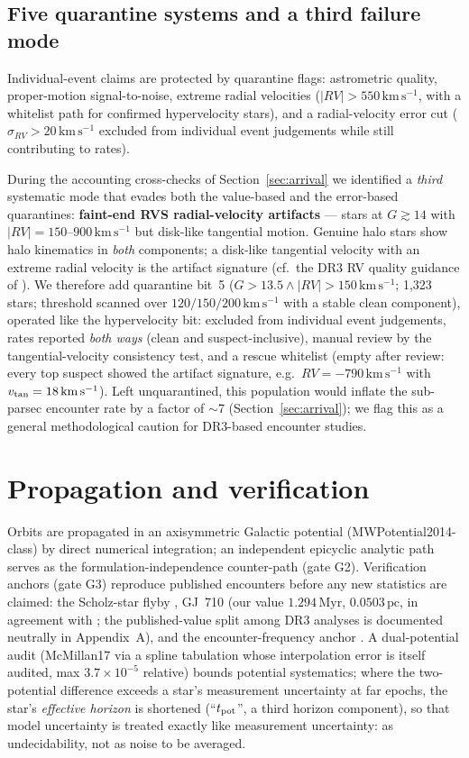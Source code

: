 \documentclass[11pt]{article}
\newcommand{\Myr}{\,\mathrm{Myr}}
\newcommand{\pc}{\,\mathrm{pc}}
\newcommand{\kms}{\,\mathrm{km\,s^{-1}}}
\begin{document}
\subsection{Five quarantine systems and a third failure mode}
\label{sec:bit5}
Individual-event claims are protected by quarantine flags: astrometric
quality, proper-motion signal-to-noise, extreme radial velocities
($|RV|>550\kms$, with a whitelist path for confirmed hypervelocity stars),
and a radial-velocity error cut ($\sigma_{RV}>20\kms$ excluded from
individual event judgements while still contributing to rates).

During the accounting cross-checks of Section~\ref{sec:arrival} we
identified a \emph{third} systematic mode that evades both the value-based
and the error-based quarantines: \textbf{faint-end RVS radial-velocity
artifacts} --- stars at $G\gtrsim14$ with $|RV|=150$--$900\kms$ but
disk-like tangential motion. Genuine halo stars show halo kinematics in
\emph{both} components; a disk-like tangential velocity with an extreme
radial velocity is the artifact signature (cf.\ the DR3 RV quality
guidance of \cite{katz23}). We therefore add quarantine bit~5
($G>13.5\wedge|RV|>150\kms$; 1{,}323 stars; threshold scanned over
$120/150/200\kms$ with a stable clean component), operated like the
hypervelocity bit: excluded from individual event judgements, rates
reported \emph{both ways} (clean and suspect-inclusive), manual review by
the tangential-velocity consistency test, and a rescue whitelist (empty
after review: every top suspect showed the artifact signature, e.g.\
$RV=-790\kms$ with $v_{\rm tan}=18\kms$). Left unquarantined, this
population would inflate the sub-parsec encounter rate by a factor of
$\sim$7 (Section~\ref{sec:arrival}); we flag this as a general
methodological caution for DR3-based encounter studies.

\section{Propagation and verification}\label{sec:prop}

Orbits are propagated in an axisymmetric Galactic potential
(MWPotential2014-class) by direct numerical integration; an independent
epicyclic analytic path serves as the formulation-independence counter-path
(gate G2). Verification anchors (gate G3) reproduce published encounters
before any new statistics are claimed: the Scholz-star flyby
\cite{mamajek15,dupuy19}, GJ~710 (our value $1.294\Myr$, $0.0503\pc$,
in agreement with \cite{dlfm22}; the published-value split among DR3
analyses is documented neutrally in Appendix~A), and the encounter-frequency
anchor \cite{bj18}. A dual-potential audit (McMillan17 \cite{mcmillan17}
via a spline tabulation whose interpolation error is itself audited,
max $3.7\times10^{-5}$ relative) bounds potential systematics; where the
two-potential difference exceeds a star's measurement uncertainty at far
epochs, the star's \emph{effective horizon} is shortened
(``$t_{\rm pot}$'', a third horizon component), so that model uncertainty is
treated exactly like measurement uncertainty: as undecidability, not as
noise to be averaged.
\end{document}
